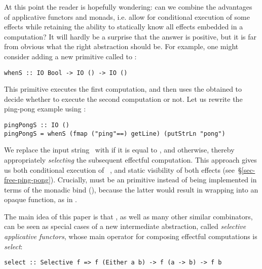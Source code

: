 At this point the reader is hopefully wondering: can we combine the advantages
of applicative functors and monads, i.e. allow for conditional execution of some
effects while retaining the ability to statically know all effects embedded in
a computation? It will hardly be a surprise that the answer is positive, but it
is far from obvious what the right abstraction should be. For example, one might
consider adding a new primitive called  to :

\vspace{0.5mm}
\begin{verbatim}
whenS :: IO Bool -> IO () -> IO ()
\end{verbatim}
\vspace{0.5mm}

\noindent
This primitive executes the first computation, and then uses the obtained
 to decide whether to execute the second computation or not. Let us
rewrite the ping-pong example using :

\vspace{0.5mm}
\begin{verbatim}
pingPongS :: IO ()
pingPongS = whenS (fmap ("ping"==) getLine) (putStrLn "pong")
\end{verbatim}
\vspace{0.5mm}

\noindent
We replace the input string~ with  if it is equal to ,
and  otherwise, thereby appropriately \emph{selecting} the subsequent
effectful computation. This approach gives us both conditional execution of
~, and static visibility of both effects
(see~\S\ref{sec-free-ping-pong}). Crucially,  must be an 
primitive instead of being implemented in terms of the monadic bind (\hs{>>=}),
because the latter would result in wrapping  into an opaque
function, as in .

The main idea of this paper is that , as well as many other similar
combinators, can be seen as special cases of a new intermediate abstraction,
called \emph{selective applicative functors}, whose main operator for composing
effectful computations is \emph{select}:

\vspace{0.5mm}
\begin{verbatim}
select :: Selective f => f (Either a b) -> f (a -> b) -> f b
\end{verbatim}
\vspace{0.5mm}

